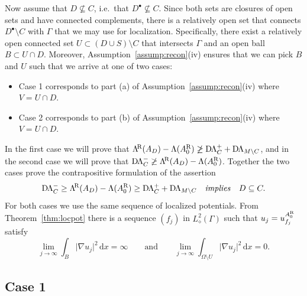 \documentclass[reqno]{amsart}
\numberwithin{equation}{section}
\numberwithin{figure}{section}
\numberwithin{table}{section}
\theoremstyle{plain}
\theoremstyle{definition}
\theoremstyle{remark}
\newcommand{\abs}[1]{\lvert#1\rvert}
\newcommand{\di}{\mathrm{d}}   %
\newcommand{\upR}{^{\textup{R}}}
\newcommand{\uptR}{^{\!\textup{R}}}
\newcommand{\LambdaR}{\Lambda\uptR}
\newcommand{\AR}{A\upR}
\newcommand{\DLambda}{\textup{D}\mkern-1.5mu \Lambda}
\begin{document}
	Now assume that $D \not\subseteq C$, i.e.~that $D^\bullet\not\subseteq C$. Since both sets are closures of open sets and have connected complements, there is a relatively open set that connects $D^\bullet\setminus C$ with $\Gamma$ that we may use for localization. Specifically, there exist a relatively open connected set $U\subset (D\cup S)\setminus C$ that intersects $\Gamma$ and an open ball $B\subset U \cap D$. Moreover, Assumption~\ref{assump:recon}(iv) ensures that we can pick $B$ and $U$ such that we arrive at one of two cases:
	\begin{itemize}
		\item Case 1 corresponds to part (a) of Assumption~\ref{assump:recon}(iv) where $V = U\cap D$.
		\item Case 2 corresponds to part (b) of Assumption~\ref{assump:recon}(iv) where $V = U\cap D$.
	\end{itemize}
	In the first case we will prove that $\LambdaR(A_D) - \Lambda(\AR_0) \not\geq \DLambda^+_{C} + \DLambda_{M\setminus C}$, and in the second case we will prove that $\DLambda^-_{C} \not\geq \LambdaR(A_D) - \Lambda(\AR_0)$. Together the two cases prove the contrapositive formulation of the assertion 
	\begin{equation*}
		\DLambda^-_{C} \geq \LambdaR(A_D) - \Lambda(\AR_0) \geq \DLambda^+_{C}+\DLambda_{M\setminus C} \quad \text{\emph{implies}} \quad D \subseteq C.
	\end{equation*}
	For both cases we use the same sequence of localized potentials. From Theorem~\ref{thm:locpot} there is a sequence $(f_j)$ in $L^2_\diamond(\Gamma)$ such that $u_j = u_{f_j}^{\AR_0}$ satisfy
	\begin{equation*}
		\lim_{j\to\infty} \int_B \abs{\nabla u_j}^2\,\di x = \infty \qquad \text{and} \qquad \lim_{j\to\infty}\int_{\Omega\setminus U} \abs{\nabla u_j}^2\,\di x = 0.
	\end{equation*}
	
	\subsection*{Case 1}
	
\end{document}
